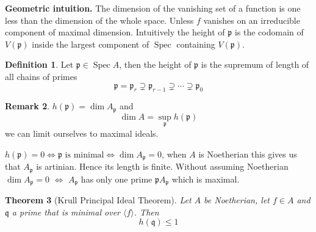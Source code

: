 \documentclass[11pt,a4paper]{article}
\theoremstyle{definition}
\newtheorem{definition}{Definition}[section]
\newtheorem{remark}[definition]{Remark}
\theoremstyle{plain}
\newtheorem{theorem}[definition]{Theorem}
\theoremstyle{remark}
\newcommand{\angles}[1]{\langle #1 \rangle}
\newcommand{\Spec}{\operatorname{Spec}}
\begin{document}
\textbf{Geometric intuition.} The dimension of the vanishing set of a function is one less than the dimension of the whole space. Unless $f$ vanishes on an irreducible component of 
maximal dimension.  Intuitively the height of $\mathfrak{p}$ is the codomain of $V(\mathfrak{p})$ inside the largest component of $\Spec$ containing $V(\mathfrak{p})$. 

\begin{definition}
    Let $\mathfrak{p} \in \Spec A$, then the height of $\mathfrak{p}$ is the supremum of length of all chains of primes 
    $$\mathfrak{p} = \mathfrak{p}_r \supsetneq \mathfrak{p}_{r-1} \supsetneq \cdots \supsetneq \mathfrak{p}_0$$
\end{definition}

\begin{remark}
    $h(\mathfrak{p}) = \dim A_\mathfrak{p}$ and 
    $$\dim A = \sup_{\mathfrak{p}} h(\mathfrak{p})$$
    we can limit ourselves to maximal ideals.  

    $h(\mathfrak{p}) = 0 \iff \mathfrak{p} \text{ is minimal} \iff \dim A_\mathfrak{p} = 0$, when $A$ is Noetherian this gives us that $A_\mathfrak{p}$ is artinian. 
    Hence its length is finite. Without assuming Noetherian $\dim A_\mathfrak{p} = 0$ $\iff$ $A_\mathfrak{p}$ has only one prime $\mathfrak{p}A_\mathfrak{p}$ which is maximal.
\end{remark}

\begin{theorem}[Krull Principal Ideal Theorem]
    Let $A$ be Noetherian, let $f \in A$ and $\mathfrak{q}$ a prime that is minimal over $\angles{f}$. Then 
    $$h(\mathfrak{q}) \le 1$$
\end{theorem}
\end{document}
